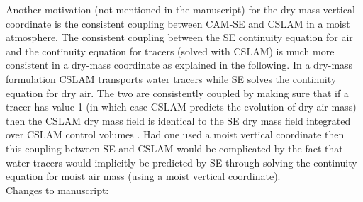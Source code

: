 \documentclass[11pt]{article}
\begin{document}
Another motivation (not mentioned in the manuscript) for the dry-mass vertical coordinate is the consistent coupling between CAM-SE and CSLAM \cite[Conservative Semi-LAgrangian Multi-tracer scheme][]{LNU2010JCP} in a moist atmosphere. The consistent coupling between the SE continuity equation for air and the continuity equation for tracers (solved with CSLAM) is much more consistent in a dry-mass coordinate as explained in the following. In a dry-mass formulation CSLAM transports water tracers while SE solves the continuity equation for dry air. The two are consistently coupled by making sure that if a tracer has value 1 (in which case CSLAM predicts the evolution of dry air mass) then the CSLAM dry mass field is identical to the SE dry mass field integrated over CSLAM control volumes \citep[how this is done is explained in detail in ][]{LTOUNGK2017MWR}. Had one used a moist vertical coordinate then this coupling between SE and CSLAM would be complicated by the fact that water tracers would implicitly be predicted by SE through solving the continuity equation for moist air mass (using a moist vertical coordinate).\\


Changes to manuscript:\\
\end{document}
